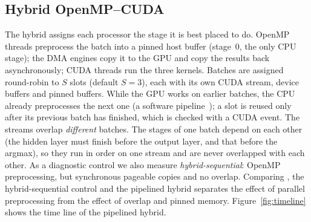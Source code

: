 \subsection{Hybrid OpenMP--CUDA}
The hybrid assigns each processor the stage it is best placed to do. OpenMP threads preprocess the batch into a pinned host buffer (stage~0, the only CPU stage); the DMA engines copy it to the GPU and copy the results back asynchronously; CUDA threads run the three kernels. Batches are assigned round-robin to $S$ slots (default $S=3$), each with its own CUDA stream, device buffers and pinned buffers. While the GPU works on earlier batches, the CPU already preprocesses the next one (a software pipeline~\cite{harris2012overlap}); a slot is reused only after its previous batch has finished, which is checked with a CUDA event. The streams overlap \emph{different} batches. The stages of one batch depend on each other (the hidden layer must finish before the output layer, and that before the argmax), so they run in order on one stream and are never overlapped with each other. As a diagnostic control we also measure \emph{hybrid-sequential}: OpenMP preprocessing, but synchronous pageable copies and no overlap. Comparing \cudabase{}, the hybrid-sequential control and the pipelined hybrid separates the effect of parallel preprocessing from the effect of overlap and pinned memory. Figure~\ref{fig:timeline} shows the time line of the pipelined hybrid.

